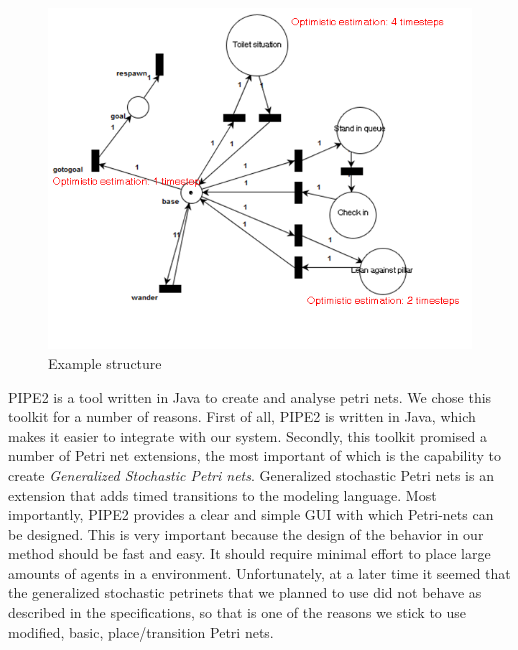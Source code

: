 \documentclass[11pt]{book}
\begin{document}
\begin{figure}
\centering
\includegraphics[width=350pt]{example}
\caption{Example structure}
\label{petrinetexample}
\end{figure}

PIPE2 is a tool written in Java to create and analyse petri nets. We chose this toolkit for a number of reasons. First of all, PIPE2 is written in Java, which makes it easier to integrate with our system. Secondly, this toolkit promised a number of Petri net extensions, the most important of which is the capability to create \emph{Generalized Stochastic Petri nets}. Generalized stochastic Petri nets is an extension that adds timed transitions to the modeling language. Most importantly, PIPE2 provides a clear and simple GUI with which Petri-nets can be designed. This is very important because the design of the behavior in our method should be fast and easy. It should require minimal effort to place large amounts of agents in a environment.
Unfortunately, at a later time it seemed that the generalized stochastic petrinets that we planned to use did not behave as described in the specifications, so that is one of the reasons we stick to use modified, basic, place/transition Petri nets.  
\end{document}
